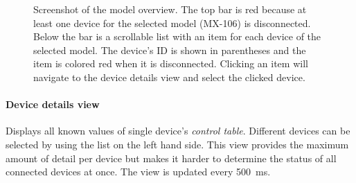 \begin{figure}[H]
    \centering
    \setlength{\fboxsep}{0mm}
    \caption[Screenshot of the model overview]{
        Screenshot of the model overview. The top bar is red because at least one device for the
        selected model (MX-106) is disconnected. Below the bar is a scrollable list with an item for
        each device of the selected model. The device's ID is shown in parentheses and the item is
        colored red when it is disconnected. Clicking an item will navigate to the device details view
        and select the clicked device.
    }
\end{figure}

\clearpage
\paragraph{Device details view}

Displays all known values of single device's \textit{control table}. Different devices can be selected
by using the list on the left hand side. This view provides the maximum amount of detail per device
but makes it harder to determine the status of all connected devices at once. The view is updated every
\SI{500}{\milli\second}.

